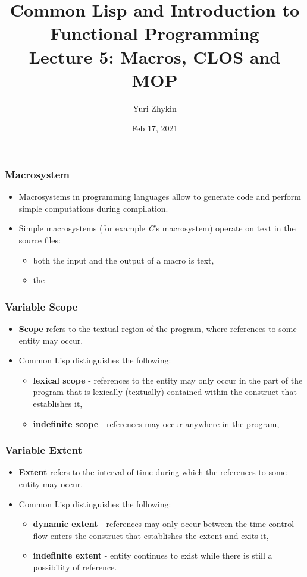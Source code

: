 \documentclass{beamer}
\title{
  Common Lisp and Introduction to Functional Programming \\
  Lecture 5: Macros, CLOS and MOP
}
\author{Yuri Zhykin}
\date{Feb 17, 2021}
\begin{document}
\frame{\titlepage}

\begin{frame}[fragile]
  \frametitle{Macrosystem}
  \begin{itemize}
  \item Macrosystems in programming languages allow to generate code and perform
    simple computations during compilation.
  \item Simple macrosystems (for example \textit{C}'s macrosystem) operate on
    text in the source files:
    \begin{itemize}
    \item both the input and the output of a macro is text,
    \item the 
    \end{itemize}
  \end{itemize}
\end{frame}

\begin{frame}[fragile]
  \frametitle{Variable Scope}
  \begin{itemize}
  \item \textbf{Scope} refers to the textual region of the program, where
    references to some entity may occur.
  \item Common Lisp distinguishes the following:
    \begin{itemize}
    \item \textbf{lexical scope} - references to the entity may only occur
      in the part of the program that is lexically (textually) contained within
      the construct that establishes it,
    \item \textbf{indefinite scope} - references may occur anywhere in the
      program,
    \end{itemize}
  \end{itemize}
\end{frame}

\begin{frame}[fragile]
  \frametitle{Variable Extent}
  \begin{itemize}
  \item \textbf{Extent} refers to the interval of time during which the
    references to some entity may occur. 
  \item Common Lisp distinguishes the following:
    \begin{itemize}
    \item \textbf{dynamic extent} - references may only occur between the time
      control flow enters the construct that establishes the extent and exits
      it,
    \item \textbf{indefinite extent} - entity continues to exist while there is
      still a possibility of reference.
    \end{itemize}
  \end{itemize}
\end{frame}
\end{document}
